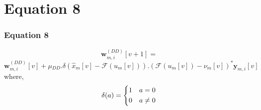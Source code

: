 \documentclass{beamer}
\theoremstyle{remark}
\let\vec\mathbf
\begin{document}
   \section{Equation 8}
\begin{frame}
\frametitle{Equation 8}
 \begin{equation*}
\vec{w}^{(DD)}_{m,i}[v+1] = 
 \end{equation*}
 \begin{equation*}
 \vec{w}^{(DD)}_{m,i}[v] + \mu{_{DD}}.\delta(\hat{x}_m[v]-{\mathcal{F}}(u_m[v])).({\mathcal{F}}(u_m[v]) - {\nu_m[v]})^*\vec{y}_{m,i}[v]
 \end{equation*}
 \newline
 \newline
 where,
\begin{align*}
\delta(a)=  \begin{dcases}
        1 & a=0 \\
        0 & a\neq 0 \\
    \end{dcases}
\end{align*} 
\end{frame}
\end{document}
